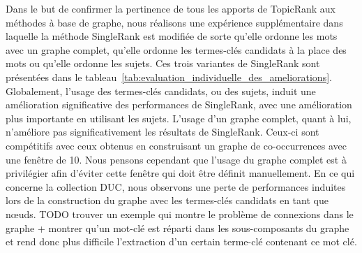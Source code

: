     Dans le but de confirmer la pertinence de tous les apports de TopicRank aux
    méthodes à base de graphe, nous réalisons une expérience supplémentaire dans
    laquelle la méthode SingleRank est modifiée de sorte qu'elle ordonne les
    mots avec un graphe complet, qu'elle ordonne les termes-clés candidats à la
    place des mots ou qu'elle ordonne les sujets. Ces trois variantes de
    SingleRank sont présentées dans le
    tableau~\ref{tab:evaluation_individuelle_des_ameliorations}. Globalement,
    l'usage des termes-clés candidats, ou des sujets, induit une amélioration
    significative des performances de SingleRank, avec une amélioration plus
    importante en utilisant les sujets. L'usage d'un graphe complet, quant à
    lui, n'améliore pas significativement les résultats de SingleRank. Ceux-ci
    sont compétitifs avec ceux obtenus en construisant un graphe de
    co-occurrences avec une fenêtre de 10. Nous pensons cependant que l'usage du
    graphe complet est à privilégier afin d'éviter cette fenêtre qui doit être
    définit manuellement. En ce qui concerne la collection DUC, nous observons
    une perte de performances induites lors de la construction du graphe avec
    les termes-clés candidats en tant que n\oe{}uds. TODO trouver un exemple qui
    montre le problème de connexions dans le graphe + montrer qu'un mot-clé est
    réparti dans les sous-composants du graphe et rend donc plus difficile
    l'extraction d'un certain terme-clé contenant ce mot clé.
